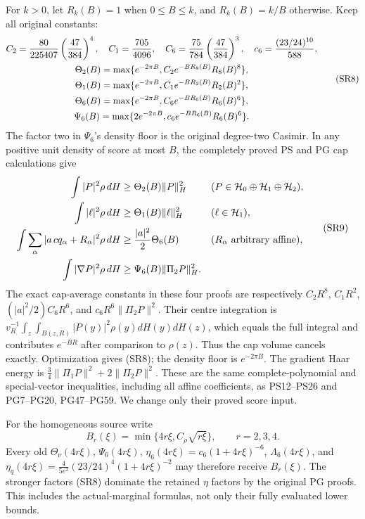 \documentclass[11pt]{article}
\begin{document}
For \(k>0\), let \(R_k(B)=1\) when \(0\le B\le k\), and \(R_k(B)=k/B\) otherwise. Keep all original constants:
\[
\begin{gathered}
C_2={80\over225407}\left({47\over384}\right)^4,
\quad C_1={705\over4096},\quad
C_6={75\over784}\left({47\over384}\right)^3,
\quad c_6={(23/24)^{10}\over588},\\
\Theta_2(B)=\max\{e^{-2\pi B},C_2e^{-BR_8(B)}R_8(B)^8\},\\
\Theta_1(B)=\max\{e^{-2\pi B},C_1e^{-BR_2(B)}R_2(B)^2\},\\
\Theta_6(B)=\max\{e^{-2\pi B},C_6e^{-BR_6(B)}R_6(B)^6\},\\
\Psi_6(B)=\max\{2e^{-2\pi B},c_6e^{-BR_6(B)}R_6(B)^6\}.
\end{gathered}\tag{SR8}
\]
The factor two in \(\Psi_6\)'s density floor is the original degree-two Casimir. In any positive unit density of score at most \(B\), the completely proved PS and PG cap calculations give
\[
\begin{aligned}
\int|P|^2\rho\,dH&\ge\Theta_2(B)\|P\|_H^2
&& (P\in\mathcal H_0\oplus\mathcal H_1\oplus\mathcal H_2),\\
\int|\ell|^2\rho\,dH&\ge\Theta_1(B)\|\ell\|_H^2
&& (\ell\in\mathcal H_1),\\
\int\sum_\alpha|a\,cq_\alpha+R_\alpha|^2\rho\,dH
&\ge {|a|^2\over2}\Theta_6(B)
&& (R_\alpha\text{ arbitrary affine}),\\
\int|\nabla P|^2\rho\,dH&\ge\Psi_6(B)\|\Pi_2P\|_H^2.
\end{aligned}\tag{SR9}
\]
The exact cap-average constants in these four proofs are respectively \(C_2R^8\), \(C_1R^2\), \((|a|^2/2)C_6R^6\), and \(c_6R^6\|\Pi_2P\|^2\). Their centre integration is
\(v_R^{-1}\int_z\int_{B(z,R)}|P(y)|^2\rho(y)dH(y)dH(z)\),
which equals the full integral and contributes \(e^{-BR}\) after comparison to \(\rho(z)\). Thus the cap volume cancels exactly. Optimization gives (SR8); the density floor is \(e^{-2\pi B}\). The gradient Haar energy is \(\tfrac34\|\Pi_1P\|^2+2\|\Pi_2P\|^2\). These are the same complete-polynomial and special-vector inequalities, including all affine coefficients, as PS12–PS26 and PG7–PG20, PG47–PG59. We change only their proved score input.

For the homogeneous source write
\[
B_r(\xi)=\min\{4r\xi,C_\rho\sqrt{r\xi}\},\qquad r=2,3,4.
\tag{SR10}
\]
Every old \(\Theta_\nu(4r\xi)\), \(\Psi_6(4r\xi)\), \(\eta_6(4r\xi)=c_6(1+4r\xi)^{-6}\), \(\Lambda_6(4r\xi)\), and \(\eta_q(4r\xi)=\tfrac4{5e^2}(23/24)^4(1+4r\xi)^{-2}\) may therefore receive \(B_r(\xi)\). The stronger factors (SR8) dominate the retained \(\eta\) factors by the original PG proofs. This includes the actual-marginal formulas, not only their fully evaluated lower bounds.
\end{document}
